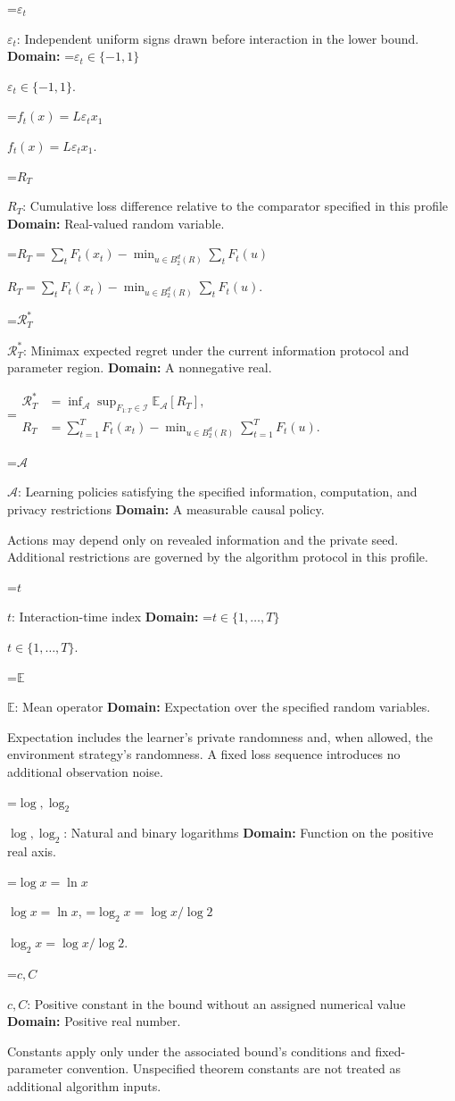 \documentclass[10pt,a4paper]{article}
\newcommand{\AtlasMath}[1]{\par\begingroup\centering\setbox0=\hbox{$\displaystyle #1$}\ifdim\wd0>1.4\linewidth\typeout{ATLAS WIDE FORMULA: \the\wd0}\fi\ifdim\wd0>\linewidth\resizebox{\linewidth}{!}{\box0}\else\box0\fi\par\endgroup}
\newcommand{\AtlasInlineMath}[1]{\begingroup\setbox0=\hbox{$#1$}\ifdim\wd0>.4\linewidth\endgroup\AtlasMath{#1}\else\endgroup$#1$\fi}
\begin{document}
\AtlasInlineMath{\varepsilon_t}: Independent uniform signs drawn before interaction in the lower bound. \textbf{Domain:} \AtlasInlineMath{\varepsilon_t\in\{-1,1\}}.

\AtlasInlineMath{f_t(x)=L\varepsilon_tx_1}.

\AtlasInlineMath{R_T}: Cumulative loss difference relative to the comparator specified in this profile \textbf{Domain:} Real-valued random variable.

\AtlasInlineMath{R_T=\sum_tF_t(x_t)-\min_{u\in B_2^d(R)}\sum_tF_t(u)}.

\AtlasInlineMath{\mathcal R_T^*}: Minimax expected regret under the current information protocol and parameter region. \textbf{Domain:} A nonnegative real.


\AtlasMath{\begin{aligned}\mathcal R_T^*&=\inf_{\mathcal A}\sup_{F_{1:T}\in\mathcal I}\mathbb E_{\mathcal A}[R_T],\\ R_T&=\sum_{t=1}^T F_t(x_t)-\min_{u\in B_2^d(R)}\sum_{t=1}^T F_t(u).\end{aligned}}


\AtlasInlineMath{\mathcal A}: Learning policies satisfying the specified information, computation, and privacy restrictions \textbf{Domain:} A measurable causal policy.

Actions may depend only on revealed information and the private seed. Additional restrictions are governed by the algorithm protocol in this profile.

\AtlasInlineMath{t}: Interaction-time index \textbf{Domain:} \AtlasInlineMath{t\in\{1,\ldots,T\}}.

\AtlasInlineMath{\mathbb E}: Mean operator \textbf{Domain:} Expectation over the specified random variables.

Expectation includes the learner's private randomness and, when allowed, the environment strategy's randomness. A fixed loss sequence introduces no additional observation noise.

\AtlasInlineMath{\log,\log_2}: Natural and binary logarithms \textbf{Domain:} Function on the positive real axis.

\AtlasInlineMath{\log x=\ln x}, \AtlasInlineMath{\log_2x=\log x/\log2}.

\AtlasInlineMath{c,C}: Positive constant in the bound without an assigned numerical value \textbf{Domain:} Positive real number.

Constants apply only under the associated bound’s conditions and fixed-parameter convention. Unspecified theorem constants are not treated as additional algorithm inputs.
\end{document}
